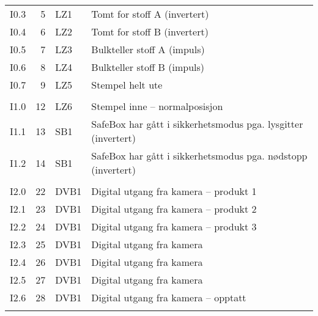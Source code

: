 \begin{table}[ht]
\begin{tabular}{>{\ttfamily}lrll}
            I0.3  &  5  &  LZ1 & Tomt for stoff A (invertert)	\\ 
            I0.4  &  6  &  LZ2 & Tomt for stoff B (invertert)	\\ 
            I0.5  &  7  &  LZ3 & Bulkteller stoff A (impuls)	\\ 
            I0.6  &  8  &  LZ4 & Bulkteller stoff B (impuls)	\\ 
            I0.7  &  9  &  LZ5 & Stempel helt ute				\\ 
            \\ 
            I1.0  &  12  & LZ6 & Stempel inne -- normalposisjon \\ 
            I1.1  &  13  & SB1  & SafeBox har gått i sikkerhetsmodus pga. lysgitter (invertert) 	 \\ 
            I1.2  &  14  & SB1  & SafeBox har gått i sikkerhetsmodus pga. nødstopp (invertert) 	 \\ 
            \\ 
            I2.0  &  22  & DVB1 & Digital utgang fra kamera -- produkt 1	\\ 
            I2.1  &  23  & DVB1 & Digital utgang fra kamera -- produkt 2	\\ 
            I2.2  &  24  & DVB1 & Digital utgang fra kamera --  produkt 3	\\ 
            I2.3  &  25  & DVB1 & Digital utgang fra kamera  			\\ 
            I2.4  &  26  & DVB1 & Digital utgang fra kamera 	 			\\ 
            I2.5  &  27  & DVB1 & Digital utgang fra kamera 				\\ 
            I2.6  &  28  & DVB1 & Digital utgang fra kamera -- opptatt				\\ 
            \\ 
        \bottomrule
    \end{tabular}
\end{table}

